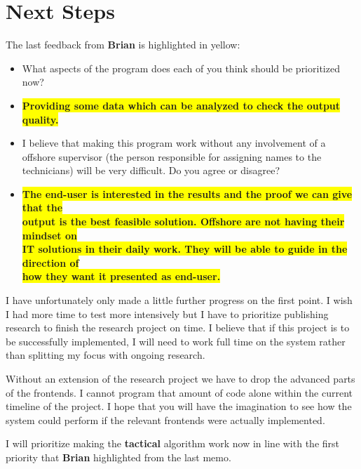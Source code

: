 \section{Next Steps}
The last feedback from \textbf{Brian} is highlighted in yellow:
\begin{itemize}
	\item What aspects of the program does each of you think should be prioritized now?
	\item \colorbox{yellow}{\textbf{Providing some data which can be analyzed to check the output quality.}}
	\item I believe that making this program work without any involvement of a offshore
    	  supervisor (the person responsible for assigning names to the technicians) 
		  will be very difficult. Do you agree or disagree?
	\item \colorbox{yellow}{\textbf{The end-user is interested in the results and the proof we can give that the}}\\
		  \colorbox{yellow}{\textbf{output is the best feasible solution. Offshore are not having their mindset on}}\\
		  \colorbox{yellow}{\textbf{IT solutions in their daily work. They will be able to guide in the direction of}}\\
		  \colorbox{yellow}{\textbf{how they want it presented as end-user.}}\\
\end{itemize} 

I have unfortunately only made a little further progress on the first point.
I wish I had more time to test more intensively but I have to prioritize
publishing research to finish the research project on time. I believe that if
this project is to be successfully implemented, I will need to work full time on
the system rather than splitting my focus with ongoing research.

Without an extension of the research project we have to drop the advanced parts
of the frontends. I cannot program that amount of code alone within the current
timeline of the project. I hope that you will have the imagination to see how the
system could perform if the relevant frontends were actually implemented. 

I will prioritize making the \textbf{tactical} algorithm work now in line
with the first priority that \textbf{Brian} highlighted from the last memo.
